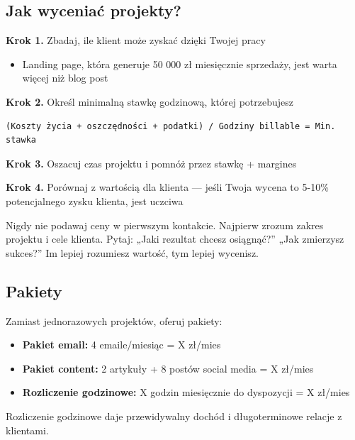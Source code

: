 \documentclass[
  12pt,
  a4paper,
  twoside,
  openright,
  12pt,
  DIV=12,
  BCOR=12mm]{scrbook}
\providecommand{\tightlist}{%
  \setlength{\itemsep}{0pt}\setlength{\parskip}{0pt}}\usepackage{longtable,booktabs,array}
\begin{document}
\subsection{Jak wyceniać projekty?}\label{jak-wyceniaux107-projekty}

\textbf{Krok 1.} Zbadaj, ile klient może zyskać dzięki Twojej pracy

\begin{itemize}
\tightlist
\item
  Landing page, która generuje 50 000 zł miesięcznie sprzedaży, jest
  warta więcej niż blog post
\end{itemize}

\textbf{Krok 2.} Określ minimalną stawkę godzinową, której potrzebujesz

\begin{verbatim}
(Koszty życia + oszczędności + podatki) / Godziny billable = Min. stawka
\end{verbatim}

\textbf{Krok 3.} Oszacuj czas projektu i pomnóż przez stawkę + margines

\textbf{Krok 4.} Porównaj z wartością dla klienta --- jeśli Twoja wycena
to 5-10\% potencjalnego zysku klienta, jest uczciwa

\begin{wskazowka}
Nigdy nie podawaj ceny w pierwszym kontakcie. Najpierw zrozum zakres projektu i cele klienta. Pytaj: „Jaki rezultat chcesz osiągnąć?” „Jak zmierzysz sukces?” Im lepiej rozumiesz wartość, tym lepiej wycenisz.
\end{wskazowka}

\subsection{Pakiety}\label{pakiety}

Zamiast jednorazowych projektów, oferuj pakiety:

\begin{itemize}
\tightlist
\item
  \textbf{Pakiet email:} 4 emaile/miesiąc = X zł/mies
\item
  \textbf{Pakiet content:} 2 artykuły + 8 postów social media = X
  zł/mies
\item
  \textbf{Rozliczenie godzinowe:} X godzin miesięcznie do dyspozycji = X
  zł/mies
\end{itemize}

Rozliczenie godzinowe daje przewidywalny dochód i długoterminowe relacje
z klientami.
\end{document}
